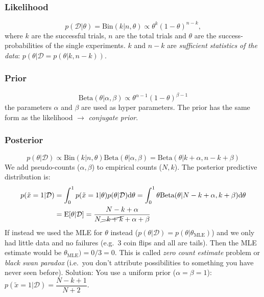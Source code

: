 \documentclass[
]{book}
\begin{document}
\hypertarget{likelihood}{%
\subsubsection{Likelihood}\label{likelihood}}

\[p(\mathcal{D}|\theta) = \text{Bin}(k|n, \theta) \propto \theta^k (1-\theta)^{n-k},\]
where \(k\) are the successful trials, \(n\) are the total trials and
\(\theta\) are the success-probabilities of the single experiments. \(k\)
and \(n-k\) are \emph{sufficient statistics of the data}:
\(p(\theta|\mathcal{D} = p(\theta|k, n-k))\).

\hypertarget{prior}{%
\subsubsection{Prior}\label{prior}}

\[\text{Beta}(\theta|\alpha, \beta) \propto \theta^{\alpha-1}(1-\theta)^{\beta-1}\]
the parameters \(\alpha\) and \(\beta\) are used as hyper parameters. The
prior has the same form as the likelihood \(\rightarrow\) \emph{conjugate
prior}.

\hypertarget{posterior}{%
\subsubsection{Posterior}\label{posterior}}

\[p(\theta|\mathcal{D}) \propto \text{Bin}(k|n,\theta)\text{Beta}(\theta|\alpha, \beta)=\text{Beta}(\theta|k+\alpha,n-k+\beta)\]
We add pseudo-counts (\(\alpha, \beta\)) to empirical counts (\(N, k\)). The
posterior predictive distribution is: \[\begin{aligned}
                p(\tilde{x}=1|\mathcal{D})& =\int_0^1 p(\tilde{x}=1|\theta)p(\theta|\mathcal{D})\mathrm{d}\theta 
                        =\int_0^1 \theta\text{Beta}(\theta|N-k+\alpha,k+\beta)\mathrm{d}\theta \\
                        & =\text{E}[\theta|\mathcal{D}]=\dfrac{N-k+\alpha}{N\cancel{-k+k}+\alpha+\beta} \\
            \end{aligned}\] If instead we used the MLE for \(\theta\)
instead (\(p(\theta|\mathcal{D}) = p(\theta|\theta_{\text{MLE}})\)) and we
only had little data and no failures (e.g.~3 coin flips and all are
tails). Then the MLE estimate would be \(\theta_{\text{MLE}}) = 0/3 = 0\).
This is called \emph{zero count estimate} problem or \emph{black swan paradox}
(i.e.~you don't attribute possibilities to something you have never seen
before). Solution: You use a uniform prior (\(\alpha = \beta = 1\)):
\(p(\tilde{x}=1|\mathcal{D}) = \dfrac{N-k+1}{N+2}\).
\end{document}
